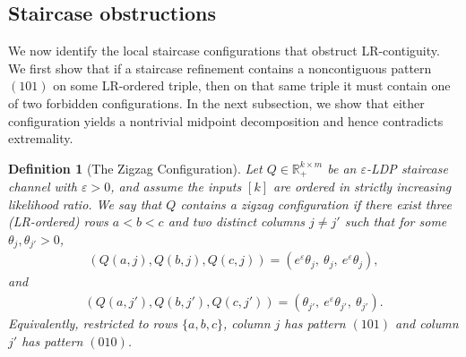\documentclass{article}
\theoremstyle{plain}
\newtheorem{definition}[theorem]{Definition}
\theoremstyle{definition}
\theoremstyle{plain}
\begin{document}
\subsection{Staircase obstructions}
\label{sec:staircase-obstructions}
We now identify the local staircase configurations that obstruct LR-contiguity. We first show that if a staircase refinement contains a noncontiguous pattern $(101)$ on some LR-ordered triple, then on that same triple it must contain one of two forbidden configurations. In the next subsection, we show that either configuration yields a nontrivial midpoint decomposition and hence contradicts extremality.
\begin{definition}[The Zigzag Configuration]
Let $Q\in\mathbb{R}_+^{k\times m}$ be an $\varepsilon$-LDP \emph{staircase} channel with $\varepsilon>0$, and assume the inputs $[k]$ are ordered in strictly increasing likelihood ratio. We say that $Q$ \emph{contains a zigzag configuration} if there exist three (LR-ordered) rows $a<b<c$ and two distinct columns $j\neq j'$ such that for some $\theta_j,\theta_{j'}>0$,
\begin{align*}
    (Q(a,j),Q(b,j),Q(c,j))=(e^\varepsilon\theta_j,\ \theta_j,\ e^\varepsilon\theta_j),
\end{align*}
and
\begin{align*}
    (Q(a,j'),Q(b,j'),Q(c,j'))=(\theta_{j'},\ e^\varepsilon\theta_{j'},\ \theta_{j'}).
\end{align*}
Equivalently, restricted to rows $\{a,b,c\}$, column $j$ has pattern $(101)$ and column $j'$ has pattern $(010)$.
\end{definition}
\end{document}
